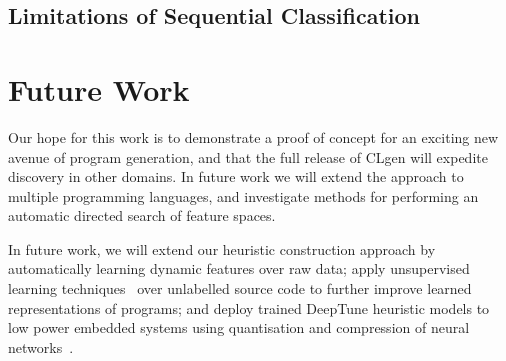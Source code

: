 


\subsection{Limitations of Sequential Classification}

\section{Future Work}

 Our hope for this work is to demonstrate a proof of concept for an exciting new avenue of program generation, and that the full release of CLgen will expedite discovery in other domains. In future work we will extend the approach to multiple programming languages, and investigate methods for performing an automatic directed search of feature spaces.

 In future work, we will extend our heuristic construction approach by automatically learning dynamic features over raw data; apply unsupervised learning techniques~\cite{Le2012} over unlabelled source code to further improve learned representations of programs; and deploy trained DeepTune heuristic models to low power embedded systems using quantisation and compression of neural networks~\cite{Han2015}.


